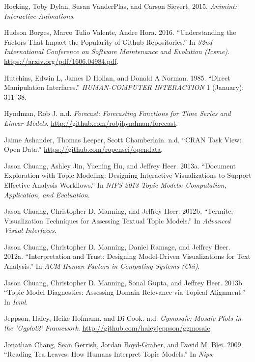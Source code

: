 \documentclass[12pt,]{isuthesis}
\begin{document}
\hypertarget{ref-animint}{}
Hocking, Toby Dylan, Susan VanderPlas, and Carson Sievert. 2015.
\emph{Animint: Interactive Animations}.

\hypertarget{ref-stars}{}
Hudson Borges, Marco Tulio Valente, Andre Hora. 2016. ``Understanding
the Factors That Impact the Popularity of Github Repositories.'' In
\emph{32nd International Conference on Software Maintenance and
Evolution (Icsme)}. \url{https://arxiv.org/pdf/1606.04984.pdf}.

\hypertarget{ref-Hutchins:1985wu}{}
Hutchins, Edwin L, James D Hollan, and Donald A Norman. 1985. ``Direct
Manipulation Interfaces.'' \emph{HUMAN-COMPUTER INTERACTION} 1
(January): 311--38.

\hypertarget{ref-forecast}{}
Hyndman, Rob J. n.d. \emph{Forecast: Forecasting Functions for Time
Series and Linear Models}. \url{http://github.com/robjhyndman/forecast}.

\hypertarget{ref-OpenData}{}
Jaime Ashander, Thomas Leeper, Scott Chamberlain. n.d. ``CRAN Task View:
Open Data.'' \url{https://github.com/ropensci/opendata}.

\hypertarget{ref-2013-termite}{}
Jason Chuang, Ashley Jin, Yuening Hu, and Jeffrey Heer. 2013a.
``Document Exploration with Topic Modeling: Designing Interactive
Visualizations to Support Effective Analysis Workflows.'' In \emph{NIPS
2013 Topic Models: Computation, Application, and Evaluation}.

\hypertarget{ref-2012-termite}{}
Jason Chuang, Christopher D. Manning, and Jeffrey Heer. 2012b.
``Termite: Visualization Techniques for Assessing Textual Topic
Models.'' In \emph{Advanced Visual Interfaces}.

\hypertarget{ref-2012-trust}{}
Jason Chuang, Christopher D. Manning, Daniel Ramage, and Jeffrey Heer.
2012a. ``Interpretation and Trust: Designing Model-Driven Visualizations
for Text Analysis.'' In \emph{ACM Human Factors in Computing Systems
(Chi)}.

\hypertarget{ref-2013-diagnostics}{}
Jason Chuang, Christopher D. Manning, Sonal Gupta, and Jeffrey Heer.
2013b. ``Topic Model Diagnostics: Assessing Domain Relevance via Topical
Alignment.'' In \emph{Icml}.

\hypertarget{ref-ggmosaic}{}
Jeppson, Haley, Heike Hofmann, and Di Cook. n.d. \emph{Ggmosaic: Mosaic
Plots in the 'Ggplot2' Framework}.
\url{http://github.com/haleyjeppson/ggmosaic}.

\hypertarget{ref-Chang}{}
Jonathan Chang, Sean Gerrish, Jordan Boyd-Graber, and David M. Blei.
2009. ``Reading Tea Leaves: How Humans Interpret Topic Models.'' In
\emph{Nips}.
\end{document}
